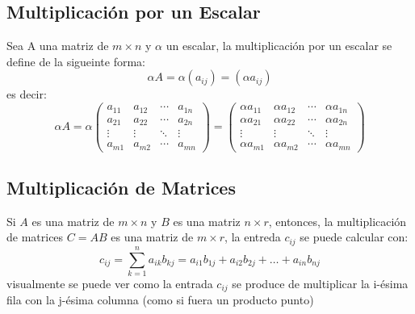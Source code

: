 \subsection{Multiplicación por un Escalar}
Sea A una matriz de $m \times n$ y $\alpha$ un escalar, la multiplicación por un escalar se define de la sigueinte forma:
\begin{equation}
	\alpha A = \alpha(a_{ij}) = (\alpha a_{ij}) 
\end{equation}
es decir:
\begin{equation*}
		\alpha A = \alpha \left(  \begin{matrix}
		a_{11} & a_{12} &\cdots   &  a_{1n}\\
		a_{21}& a_{22} & \cdots  & a_{2n} \\
		\vdots &\vdots   &  \ddots & \vdots  \\
		a_{m1} & a_{m2} & \cdots  & a_{mn}
	\end{matrix}\right) = \left(  \begin{matrix}
	\alpha a_{11} & \alpha a_{12} &\cdots   & \alpha a_{1n}\\
	\alpha a_{21}& \alpha a_{22} & \cdots  & \alpha a_{2n} \\
	\vdots &\vdots   &  \ddots & \vdots  \\
	\alpha a_{m1} &\alpha a_{m2} & \cdots  &\alpha a_{mn}
	\end{matrix}\right)
\end{equation*}
\subsection{Multiplicación de Matrices}
Si $A$ es una matriz de $m \times n$ y $B$ es una matriz $n \times r$, entonces, la multiplicación de matrices $C=AB$ es una matriz de $m \times r$, la entreda $c_{ij}$ se puede calcular con:
\begin{equation}
	c_{ij} = \sum^{n}_{k=1} a_{ik}b_{kj} = a_{i1}b_{1j}+a_{i2}b_{2j}+\dots+a_{in}b_{nj}
\end{equation}
visualmente se puede ver como la entrada $c_{ij}$ se produce de multiplicar la i-ésima fila con la j-ésima columna (como si fuera un producto punto)



